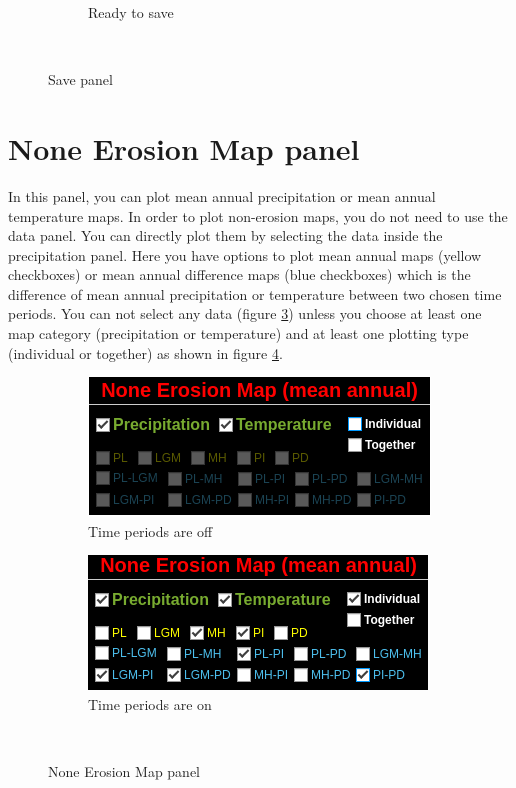 \documentclass[11pt,a4paper,titlepage]{report}
\begin{document}
\begin{figure}[H]
\begin{subfigure}[H]{0.2\textwidth}
        \caption{Ready to save}
        \label{fig:savepanel1}
    \end{subfigure}\\
    \caption[Save panel]{Save panel}
    \label{fig:savepanel}    
\end{figure}


\section{None Erosion Map panel}
In this panel, you can plot mean annual precipitation or mean annual temperature maps.
In order to plot non-erosion maps, you do not need to use the data panel. You can directly plot them by selecting the data inside the precipitation panel. Here you have options to plot mean annual maps (yellow checkboxes) or mean annual difference maps (blue checkboxes) which is the difference of mean annual precipitation or temperature between two chosen time periods. You can not select any data (figure \ref{fig:nonerosion0}) unless you choose at least one map category (precipitation or temperature) and at least one plotting type (individual or together) as shown in figure \ref{fig:nonerosion1}.\\

\begin{figure}[H]
    \centering
    \begin{subfigure}[H]{0.45\textwidth}
        \includegraphics[width=\textwidth]{noneerosion1.png}
        \caption{Time periods are off}
        \label{fig:nonerosion0}
    \end{subfigure}
    \quad
    \begin{subfigure}[H]{0.45\textwidth}
        \includegraphics[width=\textwidth]{noneerosion2.png}
        \caption{Time periods are on}
        \label{fig:nonerosion1}
    \end{subfigure}\\
    \caption[None Erosion Map panel\\ ]{None Erosion Map panel\\ }
    \label{fig:nonerosion}    
\end{figure}
\end{document}
